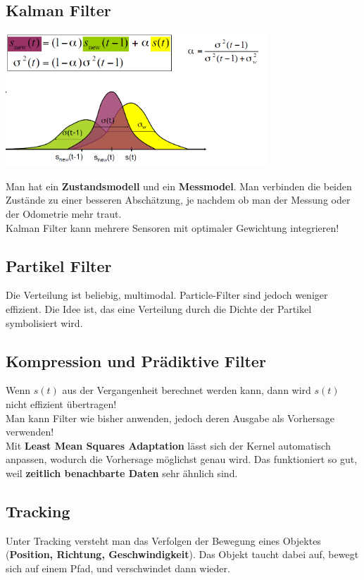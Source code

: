 \documentclass[a4paper]{article}
\begin{document}
\subsection{Kalman Filter}
\begin{center}
	\includegraphics[height = 5cm]{Kalman.png}
\end{center}
Man hat ein \textbf{Zustandsmodell} und ein \textbf{Messmodel}. Man verbinden die beiden Zustände zu einer besseren Abschätzung, je nachdem ob man der Messung oder der Odometrie mehr traut.\\

Kalman Filter kann mehrere Sensoren mit optimaler Gewichtung integrieren!

\subsection{Partikel Filter}
Die Verteilung ist beliebig, multimodal. Particle-Filter sind jedoch weniger effizient.
Die Idee ist, das eine Verteilung durch die Dichte der Partikel symbolisiert wird.

\subsection{Kompression und Prädiktive Filter}
Wenn $s(t)$ aus der Vergangenheit berechnet werden kann, dann wird $s(t)$ nicht effizient übertragen!\\

Man kann Filter wie bisher anwenden, jedoch deren Ausgabe als Vorhersage verwenden! \\

Mit \textbf{Least Mean Squares Adaptation} lässt sich der Kernel automatisch anpassen, wodurch die Vorhersage möglichst genau wird. Das funktioniert so gut, weil \textbf{zeitlich benachbarte Daten} sehr ähnlich sind.

\subsection{Tracking}
Unter Tracking versteht man das Verfolgen der Bewegung eines Objektes (\textbf{Position, Richtung, Geschwindigkeit}). Das Objekt taucht dabei auf, bewegt sich auf einem Pfad, und verschwindet dann wieder.\\
\end{document}
